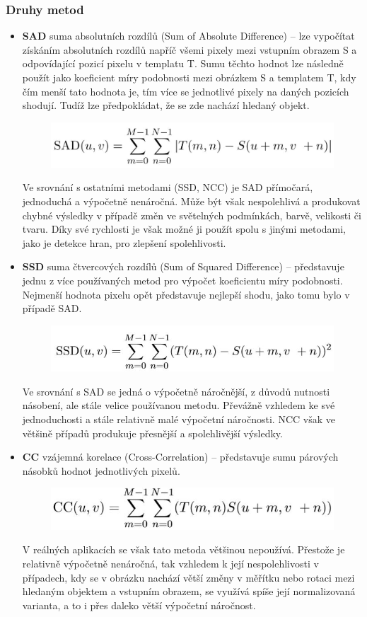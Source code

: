 \subsubsection{Druhy metod}
\begin{itemize}
\item \textbf{SAD} suma absolutních rozdílů (Sum of Absolute Difference) --  lze vypočítat získáním absolutních rozdílů napříč všemi pixely mezi vstupním obrazem S a odpovídající pozicí pixelu v templatu T. Sumu těchto hodnot lze následně použít jako koeficient míry podobnosti mezi obrázkem S a templatem T, kdy čím menší tato hodnota je, tím více se jednotlivé pixely na daných pozicích shodují. Tudíž lze předpokládat, že se zde nachází hledaný objekt. 
\begin{figure}[H]
\centering
\includegraphics[width=.6\linewidth]{assets/9_sad}
\end{figure}
Ve srovnání s ostatními metodami (SSD, NCC) je SAD přímočará, jednoduchá a výpočetně nenáročná. Může být však nespolehlivá a produkovat chybné výsledky v případě změn ve světelných podmínkách, barvě, velikosti či tvaru. Díky své rychlosti je však možné ji použít spolu s jinými metodami, jako je detekce hran, pro zlepšení spolehlivosti.
\item \textbf{SSD} suma čtvercových rozdílů (Sum of Squared Difference) --  představuje jednu z více používaných metod pro výpočet koeficientu míry podobnosti. Nejmenší hodnota pixelu opět představuje nejlepší shodu, jako tomu bylo v případě SAD.
\begin{figure}[H]
\centering
\includegraphics[width=.6\linewidth]{assets/9_ssd}
\end{figure}
Ve srovnání s SAD se jedná o výpočetně náročnější, z důvodů nutnosti násobení, ale stále velice používanou metodu. Převážně vzhledem ke své jednoduchosti a stále relativně malé výpočetní náročnosti. NCC však ve většině případů produkuje přesnější a spolehlivější výsledky.
\item \textbf{CC} vzájemná korelace (Cross-Correlation) --  představuje sumu párových násobků hodnot jednotlivých pixelů.
\begin{figure}[H]
\centering
\includegraphics[width=.6\linewidth]{assets/9_cc}
\end{figure}
V reálných aplikacích se však tato metoda většinou nepoužívá. Přestože je relativně výpočetně nenáročná, tak vzhledem k její nespolehlivosti v případech, kdy se v obrázku nachází větší změny v měřítku nebo rotaci mezi hledaným objektem a vstupním obrazem, se využívá spíše její normalizovaná varianta, a to i přes daleko větší výpočetní náročnost.


\end{itemize}
